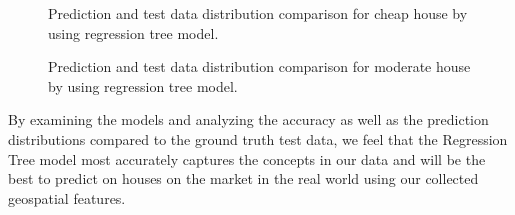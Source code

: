 \documentclass[11pt,a4paper]{article}
\begin{document}
\begin{figure}[h]
    \centering
    \hfill%
    \caption{Prediction and test data distribution comparison for cheap house by using regression tree model.}
    \label{fig:regtreecheap}
\end{figure}
\begin{figure}[h]
    \centering
    \hfill%
    \caption{Prediction and test data distribution comparison for moderate house by using regression tree model.}
    \label{fig:regtreemoderate}
\end{figure}
\FloatBarrier
By examining the models and analyzing the accuracy as well as the prediction distributions compared to the ground truth test data, we feel that the Regression Tree model most accurately captures the concepts in our data and will be the best to predict on houses on the market in the real world using our collected geospatial features.
\FloatBarrier
\end{document}
